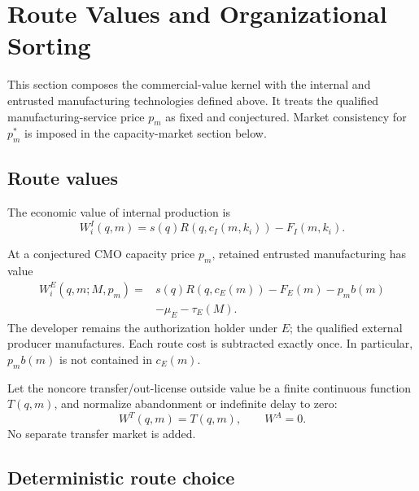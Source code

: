 \section{Route Values and Organizational Sorting}
\label{sec:p04-route-sorting}

This section composes the commercial-value kernel with the internal and
entrusted manufacturing technologies defined above. It treats the qualified
manufacturing-service price \(p_m\) as fixed and conjectured. Market
consistency for \(p_m^*\) is imposed in the capacity-market section below.

\subsection{Route values}
\label{subsec:p04-route-values}

The economic value of internal production is
\begin{equation}
  W_i^I(q,m)
  =
  s(q)R\!\left(q,c_I(m,k_i)\right)
  -
  F_I(m,k_i).
  \label{eq:p04-internal-value}
\end{equation}

At a conjectured CMO capacity price \(p_m\), retained entrusted manufacturing
has value
\begin{equation}
  \begin{aligned}
  W_i^E(q,m;M,p_m)
  ={}&
  s(q)R\!\left(q,c_E(m)\right)
  -F_E(m)-p_m b(m)\\
  &-\mu_E-\tau_E(M).
  \end{aligned}
  \label{eq:p04-entrusted-value}
\end{equation}
The developer remains the authorization holder under \(E\); the qualified
external producer manufactures. Each route cost is subtracted exactly once.
In particular, \(p_m b(m)\) is not contained in \(c_E(m)\).

Let the noncore transfer/out-license outside value be a finite continuous
function \(T(q,m)\), and normalize abandonment or indefinite delay to zero:
\begin{equation}
  W^T(q,m)=T(q,m),
  \qquad
  W^A=0.
  \label{eq:p04-outside-values}
\end{equation}
No separate transfer market is added.

\subsection{Deterministic route choice}
\label{subsec:p04-deterministic-choice}

